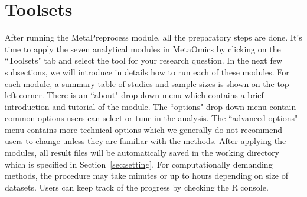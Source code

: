 \section{Toolsets}

After running the MetaPreprocess module,
all the preparatory steps are done. 
It's time to apply the seven analytical modules in MetaOmics by clicking on the ``Toolsets" tab and select the tool for your research question.
In the next few subsections, 
we will introduce in details how to run each of these modules.
For each module, a summary table of studies and sample sizes is shown on the top left corner. 
There is an ``about" drop-down menu which contains a brief introduction and tutorial of the module.
The ``options" drop-down menu contain common options users can select or tune in the analysis.
The ``advanced options" menu contains more technical options which we generally do not recommend users to change unless they are familiar with the methods.
After applying the modules, all result files will be automatically saved in the working directory which is specified in Section~\ref{sec:setting}.
For computationally demanding methods, the procedure may take minutes or up to hours depending on size of datasets.
Users can keep track of the progress by checking the R console.






